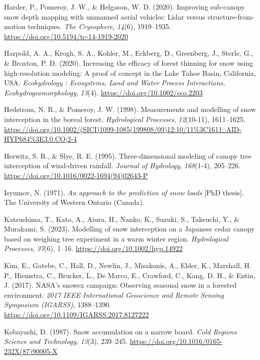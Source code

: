 \documentclass[
  letterpaper,
  DIV=11,
  numbers=noendperiod]{scrartcl}
\newlength{\cslhangindent}
\newenvironment{CSLReferences}[2] %
 {\begin{list}{}{%
  \setlength{\itemindent}{0pt}
  \setlength{\leftmargin}{0pt}
  \setlength{\parsep}{0pt}
  \ifodd #1
   \setlength{\leftmargin}{\cslhangindent}
   \setlength{\itemindent}{-1\cslhangindent}
  \fi
  \setlength{\itemsep}{#2\baselineskip}}}
 {\end{list}}
\begin{document}
\begin{CSLReferences}{1}{0}
Harder, P., Pomeroy, J. W., \& Helgason, W. D. (2020). Improving
sub-canopy snow depth mapping with unmanned aerial vehicles: {Lidar}
versus structure-from-motion techniques. \emph{The Cryosphere},
\emph{14}(6), 1919--1935. \url{https://doi.org/10.5194/tc-14-1919-2020}

Harpold, A. A., Krogh, S. A., Kohler, M., Eckberg, D., Greenberg, J.,
Sterle, G., \& Broxton, P. D. (2020). Increasing the efficacy of forest
thinning for snow using high-resolution modeling: {A} proof of concept
in the {Lake Tahoe Basin}, {California}, {USA}. \emph{Ecohydrology :
Ecosystems, Land and Water Process Interactions, Ecohydrogeomorphology},
\emph{13}(4). \url{https://doi.org/10.1002/eco.2203}

Hedstrom, N. R., \& Pomeroy, J. W. (1998). Measurements and modelling of
snow interception in the boreal forest. \emph{Hydrological Processes},
\emph{12}(10-11), 1611--1625.
\url{https://doi.org/10.1002/(SICI)1099-1085(199808/09)12:10/11\%3C1611::AID-HYP684\%3E3.0.CO;2-4}

Herwitz, S. R., \& Slye, R. E. (1995). Three-dimensional modeling of
canopy tree interception of wind-driven rainfall. \emph{Journal of
Hydrology}, \emph{168}(1-4), 205--226.
\url{https://doi.org/10.1016/0022-1694(94)02643-P}

Isyumov, N. (1971). \emph{An approach to the prediction of snow loads}
{[}PhD thesis{]}. The University of Western Ontario (Canada).

Katsushima, T., Kato, A., Aiura, H., Nanko, K., Suzuki, S., Takeuchi,
Y., \& Murakami, S. (2023). Modelling of snow interception on a
{Japanese} cedar canopy based on weighing tree experiment in a warm
winter region. \emph{Hydrological Processes}, \emph{37}(6), 1--16.
\url{https://doi.org/10.1002/hyp.14922}

Kim, E., Gatebe, C., Hall, D., Newlin, J., Misakonis, A., Elder, K.,
Marshall, H. P., Hiemstra, C., Brucker, L., De Marco, E., Crawford, C.,
Kang, D. H., \& Entin, J. (2017). {NASA}'s snowex campaign: {Observing}
seasonal snow in a forested environment. \emph{2017 {IEEE} International
Geoscience and Remote Sensing Symposium ({IGARSS})}, 1388--1390.
\url{https://doi.org/10.1109/IGARSS.2017.8127222}

Kobayashi, D. (1987). Snow accumulation on a narrow board. \emph{Cold
Regions Science and Technology}, \emph{13}(3), 239--245.
\url{https://doi.org/10.1016/0165-232X(87)90005-X}


\end{CSLReferences}
\end{document}
